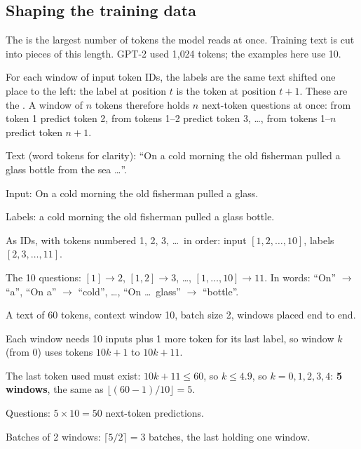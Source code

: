 \subsection*{Shaping the training data}

\begin{definition}
The  is the largest number of tokens the model reads at once. Training text is cut into pieces of this length. GPT-2 used 1,024 tokens; the examples here use 10.
\end{definition}

\begin{definition}
For each window of input token IDs, the labels are the same text shifted one place to the left: the label at position $t$ is the token at position $t+1$. These are the . A window of $n$ tokens therefore holds $n$ next-token questions at once: from token 1 predict token 2, from tokens 1--2 predict token 3, \dots, from tokens 1--$n$ predict token $n+1$.
\end{definition}

\begin{example}
Text (word tokens for clarity): ``On a cold morning the old fisherman pulled a glass bottle from the sea \dots''.
\begin{steps}
  \item Input: On a cold morning the old fisherman pulled a glass.
  \item Labels: a cold morning the old fisherman pulled a glass bottle.
  \item As IDs, with tokens numbered 1, 2, 3, \dots\ in order: input $[1, 2, \dots, 10]$, labels $[2, 3, \dots, 11]$.
  \item The 10 questions: $[1] \to 2$, $[1, 2] \to 3$, \dots, $[1, \dots, 10] \to 11$. In words: ``On'' $\to$ ``a'', ``On a'' $\to$ ``cold'', \dots, ``On \dots\ glass'' $\to$ ``bottle''.
\end{steps}
\end{example}

\begin{example}
A text of 60 tokens, context window 10, batch size 2, windows placed end to end.
\begin{steps}
  \item Each window needs 10 inputs plus 1 more token for its last label, so window $k$ (from 0) uses tokens $10k+1$ to $10k+11$.
  \item The last token used must exist: $10k + 11 \le 60$, so $k \le 4.9$, so $k = 0, 1, 2, 3, 4$: \textbf{5 windows}, the same as $\lfloor (60-1)/10 \rfloor = 5$.
  \item Questions: $5 \times 10 = 50$ next-token predictions.
  \item Batches of 2 windows: $\lceil 5/2 \rceil = 3$ batches, the last holding one window.
\end{steps}
\end{example}

